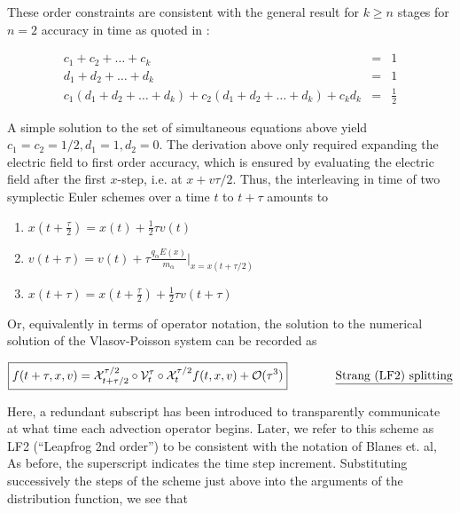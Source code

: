 \documentclass[11pt,titlepage]{report}
\begin{document}
\noindent These order constraints are consistent with the general result for $k \geq n$ stages for $n = 2$ accuracy in time as quoted in \cite[p.263]{Yoshida90}:

\begin{eqnarray*}
c_1 + c_2 + \ldots + c_k & = & 1 \\[0.3em]
d_1 + d_2 + \ldots + d_k & = & 1 \\[0.3em]
c_1(d_1 + d_2 + \ldots + d_k) + c_2(d_1 + d_2 + \ldots + d_k) + c_kd_k & = & \frac{1}{2}
\end{eqnarray*}

A simple solution to the set of simultaneous equations above yield $c_1 = c_2 = 1/2, d_1 = 1, d_2 = 0$. The derivation above only required expanding the electric field to first order accuracy, which is ensured by evaluating the electric field after the first $x$-step, i.e. at $x + v\tau / 2$. Thus, the interleaving in time of two symplectic Euler schemes over a time $t$ to $t + \tau$ amounts to


\begin{enumerate}
\item $x(t + \tfrac{\tau}{2})  = x(t) + \frac{1}{2}\tau v(t)$
\item $v(t + \tau )   =  v(t) + \tau\frac{q_{\alpha}E(x)}{m_{\alpha}}\biggr|_{x = x(t + \tau/2)}$
\item $x(t + \tau )  =  x(t + \tfrac{\tau}{2}) + \frac{1}{2}\tau v(t + \tau)$
\end{enumerate}




\noindent Or, equivalently in terms of operator notation, the solution to the numerical solution of the Vlasov-Poisson system can be recorded as

$$\boxed{f(t + \tau , x, v) = \mathcal{X}^{\tau /2}_{t + \tau /2}\circ\mathcal{V}^{\tau}_t\circ\mathcal{X}^{\tau / 2}_t f(t,x,v) + \mathcal{O}(\tau^3)} \qquad \qquad \textrm{\underline{Strang (LF2) splitting}}$$

\noindent Here, a redundant subscript has been introduced to transparently communicate at what time each advection operator begins. Later, we refer to this scheme as LF2 (``Leapfrog 2nd order'') to be consistent with the notation of Blanes et. al, As before, the superscript indicates the time step increment. Substituting successively the steps of the scheme just above into the arguments of the distribution function, we see that
\end{document}
